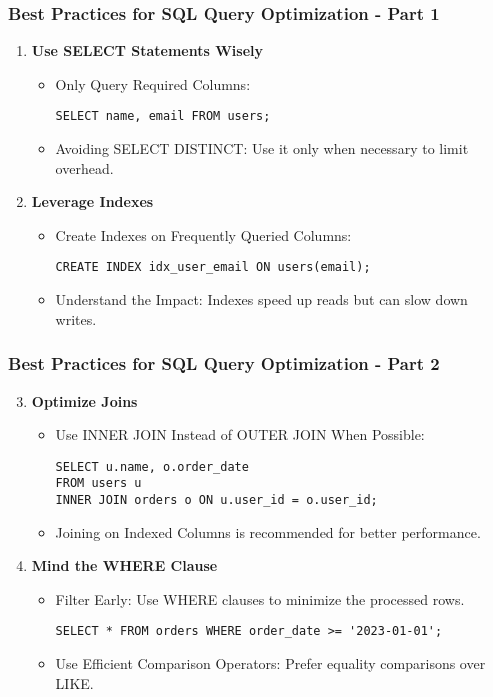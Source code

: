 \documentclass[aspectratio=169]{beamer}
\begin{document}
\begin{frame}[fragile]
    \frametitle{Best Practices for SQL Query Optimization - Part 1}
    \begin{enumerate}
        \item \textbf{Use SELECT Statements Wisely}
        \begin{itemize}
            \item Only Query Required Columns:
            \begin{lstlisting}
SELECT name, email FROM users;
            \end{lstlisting}
            \item Avoiding SELECT DISTINCT: Use it only when necessary to limit overhead.
        \end{itemize}
        
        \item \textbf{Leverage Indexes}
        \begin{itemize}
            \item Create Indexes on Frequently Queried Columns:
            \begin{lstlisting}
CREATE INDEX idx_user_email ON users(email);
            \end{lstlisting}
            \item Understand the Impact: Indexes speed up reads but can slow down writes.
        \end{itemize}
    \end{enumerate}
\end{frame}

\begin{frame}[fragile]
    \frametitle{Best Practices for SQL Query Optimization - Part 2}
    \begin{enumerate}
        \setcounter{enumi}{2}
        \item \textbf{Optimize Joins}
        \begin{itemize}
            \item Use INNER JOIN Instead of OUTER JOIN When Possible:
            \begin{lstlisting}
SELECT u.name, o.order_date 
FROM users u
INNER JOIN orders o ON u.user_id = o.user_id;
            \end{lstlisting}
            \item Joining on Indexed Columns is recommended for better performance.
        \end{itemize}
        
        \item \textbf{Mind the WHERE Clause}
        \begin{itemize}
            \item Filter Early: Use WHERE clauses to minimize the processed rows.
            \begin{lstlisting}
SELECT * FROM orders WHERE order_date >= '2023-01-01';
            \end{lstlisting}
            \item Use Efficient Comparison Operators: Prefer equality comparisons over LIKE.
        \end{itemize}
    \end{enumerate}
\end{frame}
\end{document}
